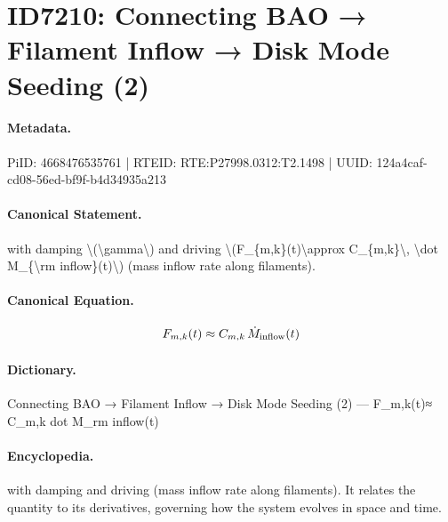 \section*{ID7210: Connecting BAO → Filament Inflow → Disk Mode Seeding (2)}
\paragraph{Metadata.}
PiID: 4668476535761 | RTEID: RTE:P27998.0312:T2.1498 | UUID: 124a4caf-cd08-56ed-bf9f-b4d34935a213

\paragraph{Canonical Statement.}
with damping \textbackslash{}(\textbackslash{}gamma\textbackslash{}) and driving \textbackslash{}(F\_\{m,k\}(t)\textbackslash{}approx C\_\{m,k\}\textbackslash{}, \textbackslash{}dot M\_\{\textbackslash{}rm inflow\}(t)\textbackslash{}) (mass inflow rate along filaments).

\paragraph{Canonical Equation.}
\[
F_{m,k}(t)\approx C_{m,k}\, \dot M_{\rm inflow}(t)
\]

\paragraph{Dictionary.}
Connecting BAO → Filament Inflow → Disk Mode Seeding (2) — F\_m,k(t)≈ C\_m,k dot M\_rm inflow(t)

\paragraph{Encyclopedia.}
with damping and driving (mass inflow rate along filaments). It relates the quantity to its derivatives, governing how the system evolves in space and time.
